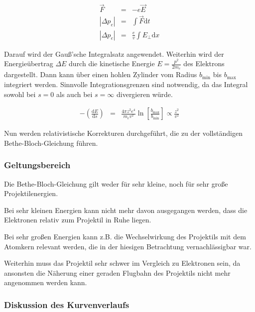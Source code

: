 \documentclass[12pt,a4paper]{scrartcl}
\numberwithin{equation}{section} %
\renewcommand{\[}{} %
\renewcommand{\]}{\noindent} %
\begin{document}
\[
\begin{eqnarray}
        \vec F &=& -e \vec E \\
        \left|\Delta p_e\right| &=& \int \vec F \mathrm dt \\
        \left|\Delta p_e\right| &=& \frac{e}{v} \int E_\perp \mathrm dx
\end{eqnarray}
\]

Darauf wird der Gauß'sche Integralsatz angewendet. Weiterhin wird der
Energieübertrag $\Delta E$ durch die kinetische Energie
$E=\frac{p^2}{2m_e}$ des Elektrons dargestellt. Dann kann über einen
hohlen Zylinder vom Radius $b_\mathrm{min}$ bis $b_\mathrm{max}$
integriert werden. Sinnvolle Integrationsgrenzen sind notwendig, da das
Integral sowohl bei $s=0$ als auch bei $s=\infty$ divergieren würde.

\[
\begin{eqnarray}
        -\left(\frac{\mathrm dE}{\mathrm ds}\right)
                &=& \frac{4\pi z^2 e^4}{m_ev^2}
                        \ln\left[\frac{b_\mathrm{max}}{b_\mathrm{min}}\right]
                        \propto \frac{z^2}{v^2}
\end{eqnarray}
\]

Nun werden relativistische Korrekturen durchgeführt, die zu der
vollständigen Bethe-Bloch-Gleichung führen.

\hypertarget{geltungsbereich}{%
\subsubsection{Geltungsbereich}\label{geltungsbereich}}

Die Bethe-Bloch-Gleichung gilt weder für sehr kleine, noch für sehr
große Projektilenergien.

Bei sehr kleinen Energien kann nicht mehr davon ausgegangen werden, dass
die Elektronen relativ zum Projektil in Ruhe liegen.

Bei sehr großen Energien kann z.B. die Wechselwirkung des Projektils mit
dem Atomkern relevant werden, die in der hiesigen Betrachtung
vernachlässigbar war.

Weiterhin muss das Projektil sehr schwer im Vergleich zu Elektronen
sein, da ansonsten die Näherung einer geraden Flugbahn des Projektils
nicht mehr angenommen werden kann.

\hypertarget{diskussion-des-kurvenverlaufs}{%
\subsubsection{Diskussion des
Kurvenverlaufs}\label{diskussion-des-kurvenverlaufs}}
\end{document}
